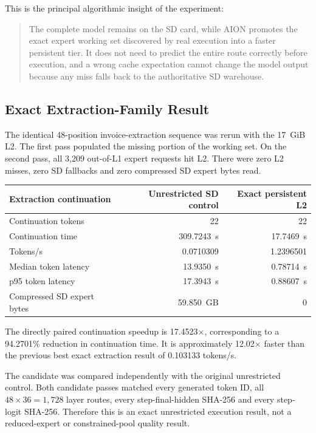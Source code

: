 This is the principal algorithmic insight of the experiment:

\begin{quote}
The complete model remains on the SD card, while AION promotes the exact expert
working set discovered by real execution into a faster persistent tier.  It
does not need to predict the entire route correctly before execution, and a
wrong cache expectation cannot change the model output because any miss falls
back to the authoritative SD warehouse.
\end{quote}

\subsection{Exact Extraction-Family Result}

The identical 48-position invoice-extraction sequence was rerun with the
17~GiB L2.  The first pass populated the missing portion of the working set.
On the second pass, all 3,209 out-of-L1 expert requests hit L2.  There were zero
L2 misses, zero SD fallbacks and zero compressed SD expert bytes read.

\begin{center}
\begin{tabular}{@{}lrr@{}}
\toprule
Extraction continuation & Unrestricted SD control & Exact persistent L2 \\
\midrule
Continuation tokens & 22 & 22 \\
Continuation time & 309.7243~s & 17.7469~s \\
Tokens/s & 0.0710309 & 1.2396501 \\
Median token latency & 13.9350~s & 0.78714~s \\
p95 token latency & 17.3943~s & 0.88607~s \\
Compressed SD expert bytes & 59.850~GB & 0 \\
\bottomrule
\end{tabular}
\end{center}

The directly paired continuation speedup is 17.4523$\times$, corresponding to
a 94.2701\% reduction in continuation time.  It is approximately
12.02$\times$ faster than the previous best exact extraction result of
0.103133 tokens/s.

The candidate was compared independently with the original unrestricted
control.  Both candidate passes matched every generated token ID, all
$48\times36=1{,}728$ layer routes, every step-final-hidden SHA-256 and every
step-logit SHA-256.  Therefore this is an exact unrestricted execution result,
not a reduced-expert or constrained-pool quality result.


